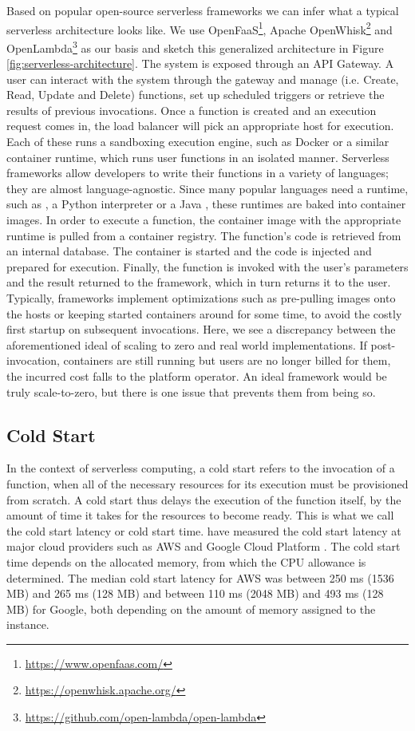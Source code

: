 Based on popular open-source serverless frameworks we can infer what a typical serverless architecture looks like. We use OpenFaaS\footnote{\url{https://www.openfaas.com/}}, Apache OpenWhisk\footnote{\url{https://openwhisk.apache.org/}} and OpenLambda\footnote{\url{https://github.com/open-lambda/open-lambda}} as our basis and sketch this generalized architecture in Figure \ref{fig:serverless-architecture}. The system is exposed through an API Gateway. A user can interact with the system through the gateway and manage (i.e. Create, Read, Update and Delete) functions, set up scheduled triggers or retrieve the results of previous invocations. Once a function is created and an execution request comes in, the load balancer will pick an appropriate host for execution. Each of these runs a sandboxing execution engine, such as Docker or a similar container runtime, which runs user functions in an isolated manner.
Serverless frameworks allow developers to write their functions in a variety of languages; they are almost language-agnostic. Since many popular languages need a runtime, such as , a Python interpreter or a Java , these runtimes are baked into container images. In order to execute a function, the container image with the appropriate runtime is pulled from a container registry.
The function's code is retrieved from an internal database. The container is started and the code is injected and prepared for execution. Finally, the function is invoked with the user's parameters and the result returned to the framework, which in turn returns it to the user. Typically, frameworks implement optimizations such as pre-pulling images onto the hosts or keeping started containers around for some time, to avoid the costly first startup on subsequent invocations. Here, we see a discrepancy between the aforementioned ideal of scaling to zero and real world implementations. If post-invocation, containers are still running but users are no longer billed for them, the incurred cost falls to the platform operator. An ideal framework would be truly scale-to-zero, but there is one issue that prevents them from being so.

\subsection{Cold Start}

In the context of serverless computing, a cold start refers to the invocation of a function, when all of the necessary resources for its execution must be provisioned from scratch. A cold start thus delays the execution of the function itself, by the amount of time it takes for the resources to become ready. This is what we call the cold start latency or cold start time. \citeauthor{Wang2018} have measured the cold start latency at major cloud providers such as AWS and Google Cloud Platform \cite{Wang2018}. The cold start time depends on the allocated memory, from which the CPU allowance is determined. The median cold start latency for AWS was between 250 ms (1536 MB) and 265 ms (128 MB) and between 110 ms (2048 MB) and 493 ms (128 MB) for Google, both depending on the amount of memory assigned to the instance.

